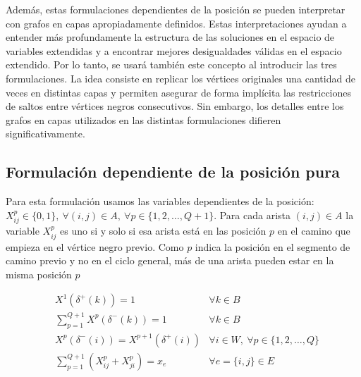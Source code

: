 \documentclass[10pt, a4paper]{article}
\theoremstyle{definition}
\begin{document}
Además, estas formulaciones dependientes de la posición se pueden interpretar con grafos en capas apropiadamente definidos. Estas interpretaciones ayudan a entender más profundamente la estructura de las soluciones en el espacio de variables extendidas y a encontrar mejores desigualdades válidas en el espacio extendido. Por lo tanto, se usará también este concepto al introducir las tres formulaciones.
La idea consiste en replicar los vértices originales una cantidad de veces en distintas capas y permiten asegurar de forma implícita las restricciones de saltos entre vértices negros consecutivos. Sin embargo, los detalles entre los grafos en capas utilizados en las distintas formulaciones difieren significativamente.

\subsection{Formulación dependiente de la posición pura}

Para esta formulación usamos las variables dependientes de la posición: $X^p_{ij} \in \{0,1\},\ \forall (i,j) \in A,\ \forall p \in \{1,2,\dots,Q+1\}$.
Para cada arista $(i,j) \in A$ la variable $X^p_{ij}$ es uno si y solo si esa arista está en las posición $p$ en el camino que empieza en el vértice negro previo. Como $p$ indica la posición en el segmento de camino previo y no en el ciclo general, más de una arista pueden estar en la misma posición $p$

\begin{align}
	& X^{1}\left(\delta^{+}(k)\right)=1 & \forall k \in B \label{eq:14} \\
	& \sum_{p=1}^{Q+1} X^{p}\left(\delta^{-}(k)\right)=1 & \forall k \in B \label{eq:15} \\
	& X^{p}\left(\delta^{-}(i)\right)=X^{p+1}\left(\delta^{+}(i)\right) & \forall i \in W,\ \forall p \in\{1,2, \ldots, Q\} \label{eq:16} \\
	& \sum_{p=1}^{Q+1}\left(X_{i j}^{p}+X_{j i}^{p}\right)=x_{e} & \forall e=\{i, j\} \in E \label{eq:17}
\end{align}
\end{document}
